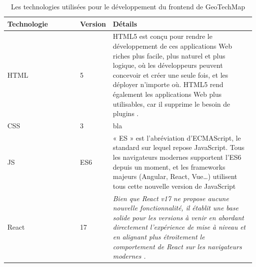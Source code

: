         \begin{table}
                \centering
                \begin{tabular}{|p{0.30\linewidth}|p{0.10\linewidth}|p{0.60\linewidth}|}
                \hline
                        \textbf{Technologie}&\textbf{Version}&\textbf{Détails}\\
                        \hline
                        HTML&
                        5&
                        HTML5 est conçu pour rendre le développement de ces applications Web 
                        riches plus facile, plus naturel et plus logique, où les développeurs 
                        peuvent concevoir et créer une seule fois, et les déployer n'importe où. 
                        HTML5 rend également les applications Web plus utilisables, car il supprime 
                        le besoin de plugins \cite{wang2013definitive}.
                        \\
                        \hline
                        CSS&
                        3&
                        bla
                        \\
                        \hline
                        JS&
                        ES6&
                        « ES » est l’abréviation d’ECMAScript, le standard sur lequel repose JavaScript.
                        Tous les navigateurs modernes supportent l’ES6 depuis un moment, et les 
                        frameworks majeurs (Angular, React, Vue…) utilisent tous cette nouvelle version de JavaScript
                        \\
                        \hline
                        React&
                        17&
                        \textit{Bien que React v17 ne propose aucune nouvelle fonctionnalité, 
                        il établit une base solide pour les versions à venir en abordant directement 
                        l'expérience de mise à niveau et en alignant plus étroitement le comportement 
                        de React sur les navigateurs modernes \cite{Vardhan2020}.}
                        \\
                        \hline
                      
                \end{tabular}
                \caption{Les technologies utilisées pour le développement du frontend de GeoTechMap} 
                \label{tab:techoFrontend}
        \end{table}
        \par
